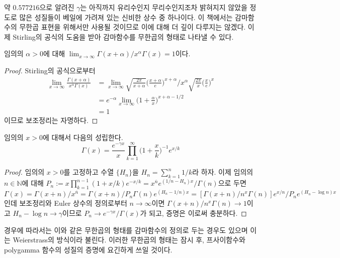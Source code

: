 약 $0.577216$으로 알려진 $\gamma$는 아직까지 유리수인지 무리수인지조차 밝혀지지 않았을 정도로 많은 성질들이 베일에 가려져 있는 신비한 상수 중 하나이다. 이 책에서는 감마함수의 무한곱 표현을 위해서만 사용될 것이므로 이에 대해 더 깊이 다루지는 않겠다. 이제 Stirling의 공식의 도움을 받아 감마함수를 무한곱의 형태로 나타낼 수 있다.

\begin{lemma}
    임의의 $\alpha>0$에 대해 $\lim_{x\to\infty}\Gamma(x+\alpha)/x^\alpha\Gamma(x)=1$이다.
\end{lemma}

\begin{proof}
    Stirling의 공식으로부터
    \begin{align*}
        \lim_{x\to\infty}\frac{\Gamma(x+\alpha)}{x^\alpha\Gamma(x)}&=\lim_{x\to\infty}\sqrt{\frac{2\pi}{x+\alpha}}\bigg(\frac{x+\alpha}{e}\bigg)^{x+\alpha}\bigg/x^\alpha\sqrt{\frac{2\pi}{x}}\bigg(\frac{x}{e}\bigg)^x\\
        &=e^{-\alpha}\lim_{x\to\infty}\bigg(1+\frac{\alpha}{x}\bigg)^{x+\alpha-1/2}\\
        &=1
    \end{align*}
    이므로 보조정리는 자명하다.
\end{proof}

\begin{theorem}[Weierstrass]
    임의의 $x>0$에 대해서 다음의 성립한다.
    \begin{equation*}
        \Gamma(x)=\frac{e^{-\gamma x}}{x}\prod_{k=1}^\infty\bigg(1+\frac{x}{k}\bigg)^{-1}e^{x/k}
    \end{equation*}
\end{theorem}

\begin{proof}
    임의의 $x>0$를 고정하고 수열 $\{H_n\}$을 $H_n=\sum_{k=1}^n1/k$라 하자. 이제 임의의 $n\in\mathbb{N}$에 대해 $P_n:=x\prod_{k=1}^{n-1}(1+x/k)e^{-x/k}=x^{\overline{n}}e^{(1/n-H_n)x}/\Gamma(n)$으로 두면 $\Gamma(x)=\Gamma(x+n)/x^{\overline{n}}=\Gamma(x+n)/P_n\Gamma(n)e^{(H_n-1/n)x}=[\Gamma(x+n)/n^x\Gamma(n)]e^{x/n}/P_ne^{(H_n-\log n)x}$인데 보조정리와 Euler 상수의 정의로부터 $n\to\infty$이면 $\Gamma(x+n)/n^x\Gamma(n)\to1$이고 $H_n-\log n\to\gamma$이므로 $P_n\to e^{-\gamma x}/\Gamma(x)$가 되고, 증명은 이로써 충분하다.
\end{proof}

경우에 따라서는 이와 같은 무한곱의 형태를 감마함수의 정의로 두는 경우도 있으며 이는 Weierstrass의 방식이라 불린다. 이러한 무한곱의 형태는 잠시 후, 프사이함수와 polygamma 함수의 성질의 증명에 요긴하게 쓰일 것이다.

